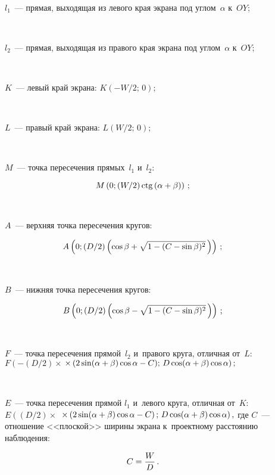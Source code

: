 \begin{multicols}{2}
\begin{description}
\item[\,] $l_1$~--- прямая, выходящая из левого края экрана под углом~$\alpha$
к~$OY$;
\item[\,]
$l_2$~--- прямая, выходящая из правого края экрана под углом~$\alpha$
к~$OY$;
\item[\,]
$K$~--- левый край экрана: $K\left( -{W}/{2};\,0\right);$
\item[\,]
$L$~--- правый край экрана: $L\left( {W}/{2};\,0\right);$
\item[\,]
$M$~--- точка пересечения прямых~$l_1$ и~$l_2$:

\noindent
$$
M\left( 0;({W}/{2})\ctg(\alpha\hm+\beta)\right)\,;
$$

\vspace*{-4pt}
\item[\,]
$A$~--- верхняя точка пересечения кругов:


\noindent
$$
A\left( 0;({D}/{2})\left(\cos\beta\hm+\sqrt{1-(C-\sin\beta)^2}\,\right)\right)\,;
$$

\vspace*{-4pt}

\item[\,]
$B$~--- нижняя точка пересечения кругов:

\vspace*{-2pt}

\noindent
$$
B\left( 0;({D}/{2})\left( \cos\beta \hm-\sqrt{1-(C-\sin\beta)^2}\,\right)\right)\,;
$$

\vspace*{-2pt}

\item[\,]
$F$~--- точка пересечения прямой~$l_2$ и~правого круга, отличная от~$L$:
$F\left( -({D}/{2})\times\right.$\linebreak $\left.\times\left(2\sin(\alpha\hm+\beta\right)\cos\alpha\hm-
C);\,D\cos(\alpha\hm+\beta)\cos\alpha\right);$
\item[\,]
$E$~--- точка пересечения прямой $l_1$ и~левого круга, отличная от~$K$:
$E\left( ({D}/{2})\times\right.$ $\left.\times\left(2\sin(\alpha\hm+\beta)\cos\alpha\hm -
C\right);\,D\cos(\alpha\hm+\beta)\cos\alpha\right),$
где $C$~---
отношение <<плоской>> ширины экрана к~проектному расстоянию
наблюдения:

\vspace*{-2pt}

\noindent
\begin{equation}
C=\displaystyle\frac{\displaystyle W\mathstrut}{\displaystyle D\mathstrut}\,.
\label{e1-zat}
\end{equation}


\end{description}
\end{multicols}
